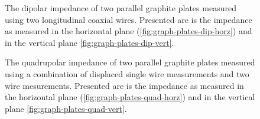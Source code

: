 \begin{figure}
\label{fig:graph-plates-dipolar}
\caption{The dipolar impedance of two parallel graphite plates measured using two longitudinal coaxial wires. Presented are is the impedance as measured in the horizontal plane (\ref{fig:graph-plates-dip-horz}) and in the vertical plane \ref{fig:graph-plates-dip-vert}.}
\end{figure}

\begin{figure}
\label{fig:graph-plates-quadrupolar}
\caption{The quadrupolar impedance of two parallel graphite plates measured using a combination of displaced single wire measurements and two wire mesurements. Presented are is the impedance as measured in the horizontal plane (\ref{fig:graph-plates-quad-horz}) and in the vertical plane \ref{fig:graph-plates-quad-vert}.}
\end{figure}

